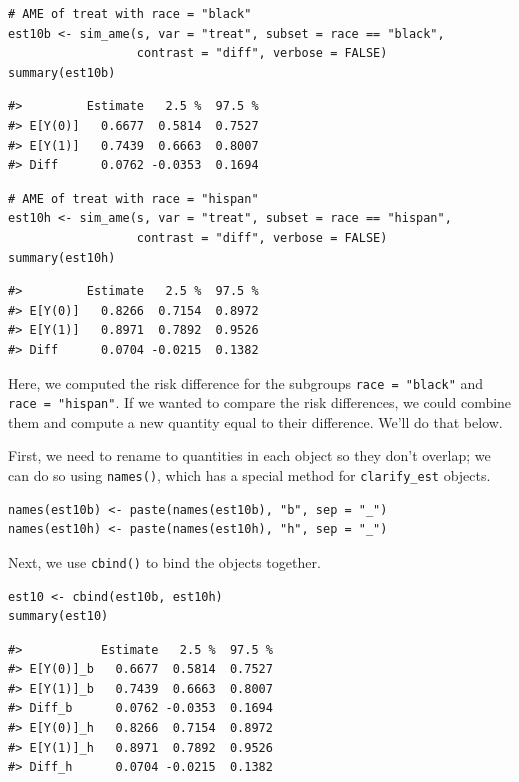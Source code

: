 \begin{verbatim}
# AME of treat with race = "black"
est10b <- sim_ame(s, var = "treat", subset = race == "black",
                  contrast = "diff", verbose = FALSE)
summary(est10b)
\end{verbatim}

\begin{verbatim}
#>         Estimate   2.5 %  97.5 %
#> E[Y(0)]   0.6677  0.5814  0.7527
#> E[Y(1)]   0.7439  0.6663  0.8007
#> Diff      0.0762 -0.0353  0.1694
\end{verbatim}

\begin{verbatim}
# AME of treat with race = "hispan"
est10h <- sim_ame(s, var = "treat", subset = race == "hispan",
                  contrast = "diff", verbose = FALSE)
summary(est10h)
\end{verbatim}

\begin{verbatim}
#>         Estimate   2.5 %  97.5 %
#> E[Y(0)]   0.8266  0.7154  0.8972
#> E[Y(1)]   0.8971  0.7892  0.9526
#> Diff      0.0704 -0.0215  0.1382
\end{verbatim}

Here, we computed the risk difference for the subgroups \texttt{race\ =\ "black"} and \texttt{race\ =\ "hispan"}. If we wanted to compare the risk differences, we could combine them and compute a new quantity equal to their difference. We'll do that below.

First, we need to rename to quantities in each object so they don't overlap; we can do so using \texttt{names()}, which has a special method for \texttt{clarify\_est} objects.

\begin{verbatim}
names(est10b) <- paste(names(est10b), "b", sep = "_")
names(est10h) <- paste(names(est10h), "h", sep = "_")
\end{verbatim}

Next, we use \texttt{cbind()} to bind the objects together.

\begin{verbatim}
est10 <- cbind(est10b, est10h)
summary(est10)
\end{verbatim}

\begin{verbatim}
#>           Estimate   2.5 %  97.5 %
#> E[Y(0)]_b   0.6677  0.5814  0.7527
#> E[Y(1)]_b   0.7439  0.6663  0.8007
#> Diff_b      0.0762 -0.0353  0.1694
#> E[Y(0)]_h   0.8266  0.7154  0.8972
#> E[Y(1)]_h   0.8971  0.7892  0.9526
#> Diff_h      0.0704 -0.0215  0.1382
\end{verbatim}

